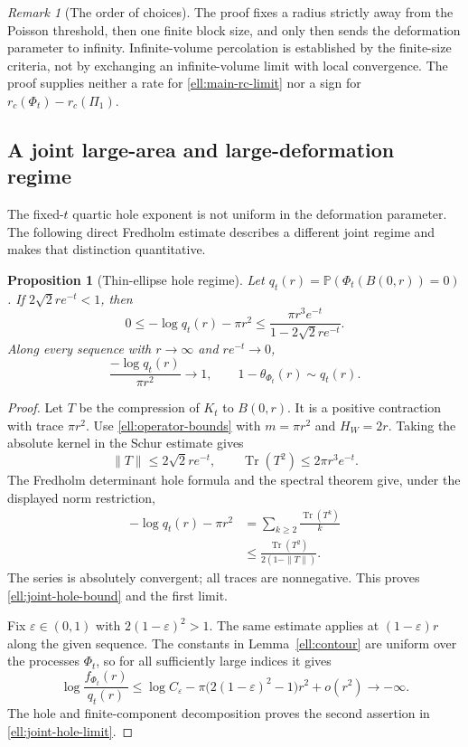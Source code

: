 \documentclass[11pt,a4paper]{article}
\newtheorem{proposition}[theorem]{Proposition}
\theoremstyle{definition}
\theoremstyle{remark}
\newtheorem{remark}[theorem]{Remark}
\numberwithin{equation}{section}
\begin{document}
\begin{remark}[The order of choices]\label{ell:limit-scope}
The proof fixes a radius strictly away from the Poisson threshold,
then one finite block size, and only then sends the deformation
parameter to infinity.  Infinite-volume percolation is established
by the finite-size criteria, not by exchanging an infinite-volume
limit with local convergence.  The proof supplies neither a rate
for \eqref{ell:main-rc-limit} nor a sign for
$r_c(\Phi_t)-r_c(\Pi_1)$.
\end{remark}

\subsection{A joint large-area and large-deformation regime}

The fixed-$t$ quartic hole exponent is not uniform in the
deformation parameter.  The following direct Fredholm estimate
describes a different joint regime and makes that distinction
quantitative.

\begin{proposition}[Thin-ellipse hole regime]\label{ell:joint-hole}
Let $q_t(r)=\mathbb P(\Phi_t(B(0,r))=0)$.  If
$2\sqrt2 r e^{-t}<1$, then
\begin{equation}\label{ell:joint-hole-bound}
 0\le-\log q_t(r)-\pi r^2
 \le\frac{\pi r^3e^{-t}}{1-2\sqrt2 r e^{-t}}.
\end{equation}
Along every sequence with $r\to\infty$ and $r e^{-t}\to0$,
\begin{equation}\label{ell:joint-hole-limit}
 \frac{-\log q_t(r)}{\pi r^2}\longrightarrow1,
 \qquad
 1-\theta_{\Phi_t}(r)\sim q_t(r).
\end{equation}
\end{proposition}

\begin{proof}
Let $T$ be the compression of $K_t$ to $B(0,r)$.
It is a positive contraction with trace $\pi r^2$.
Use \eqref{ell:operator-bounds} with $m=\pi r^2$ and
$H_W=2r$.  Taking the absolute kernel in the Schur estimate
gives
\[
 \|T\|\le2\sqrt2 r e^{-t},\qquad
 \operatorname{Tr}(T^2)\le2\pi r^3e^{-t}.
\]
The Fredholm determinant hole formula and the spectral theorem
give, under the displayed norm restriction,
\begin{align*}
 -\log q_t(r)-\pi r^2
 &=\sum_{k\ge2}\frac{\operatorname{Tr}(T^k)}k\\
 &\le\frac{\operatorname{Tr}(T^2)}{2(1-\|T\|)}.
\end{align*}
The series is absolutely convergent; all traces are nonnegative.
This proves \eqref{ell:joint-hole-bound} and the first limit.

Fix $\varepsilon\in(0,1)$ with $2(1-\varepsilon)^2>1$.
The same estimate applies at $(1-\varepsilon)r$ along the given
sequence.  The constants in Lemma~\ref{ell:contour} are uniform
over the processes $\Phi_t$, so for all sufficiently large
indices it gives
\[
 \log\frac{f_{\Phi_t}(r)}{q_t(r)}
 \le\log C_\varepsilon
    -\pi\bigl(2(1-\varepsilon)^2-1\bigr)r^2+o(r^2)
 \longrightarrow-\infty.
\]
The hole and finite-component decomposition proves the second
assertion in \eqref{ell:joint-hole-limit}.
\end{proof}
\end{document}
